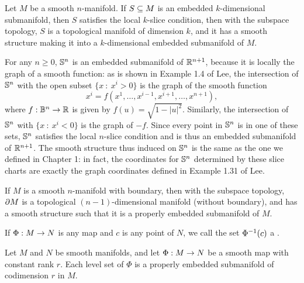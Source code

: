 \setcounter{thm}{7}

\begin{thm}
Let $M$ be a smooth $n$-manifold. If $S\subseteq M$ is an embedded $k$-dimensional submanifold, then $S$ satisfies the local $k$-slice condition, then with the subspace topology, $S$ is a topological manifold of dimension $k$, and it has a smooth structure making it into a $k$-dimensional embedded submanifold of $M$.
\end{thm}

\begin{ex}
For any $n\geq 0$, $\mathbb{S}^n$ is an embedded submanifold of $\mathbb{R}^{n + 1}$, because it is locally the graph of a smooth function: as is shown in Example 1.4 of Lee, the intersection of $\mathbb{S}^n$ with the open subset $\{x\ :\ x^i > 0\}$ is the graph of the smooth function
\[x^i = f(x^1, \ldots, x^{i - 1}, x^{i + 1}, \ldots, x^{n + 1}),\]
where $f:\mathbb{B}^n\rightarrow \mathbb{R}$ is given by $f(u) = \sqrt{1 - |u|^2}$. Similarly, the intersection of $\mathbb{S}^n$ with $\{x\ :\ x^i < 0\}$ is the graph of $-f$. Since every point in $\mathbb{S}^n$ is in one of these sets, $\mathbb{S}^n$ satisfies the local $n$-slice condition and is thus an embedded submanifold of $\mathbb{R}^{n + 1}$. The smooth structure thus induced on $\mathbb{S}^n$ is the same as the one we defined in Chapter 1: in fact, the coordinates for $\mathbb{S}^n$ determined by these slice charts are exactly the graph coordinates defined in Example 1.31 of Lee.
\end{ex}

\setcounter{thm}{10}

\begin{thm}
If $M$ is a smooth $n$-manifold with boundary, then with the subspace topology, $\partial M$ is a topological $(n - 1)$-dimensional manifold (without boundary), and has a smooth structure such that it is a properly embedded submanifold of $M$.
\end{thm}

\dfn If $\Phi:M\rightarrow N$ is any map and $c$ is any point of $N$, we call the set $\Phi^{-1}(c)$ a .

\setcounter{thm}{11}

\begin{thm}
Let $M$ and $N$ be smooth manifolds, and let $\Phi:M\rightarrow N$ be a smooth map with constant rank $r$. Each level set of $\Phi$ is a properly embedded submanifold of codimension $r$ in $M$.
\end{thm}

